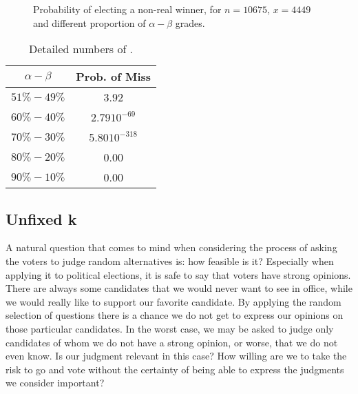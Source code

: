 \documentclass[version=3.21, pagesize, twoside=off, bibliography=totoc, DIV=calc, fontsize=12pt, a4paper]{scrartcl}
\begin{document}
\begin{figure}
	\centering
	\caption{Probability of electing a non-real winner, for $n=10675$, $x=4449$ and different proportion of $\alpha - \beta$ grades.}
	\label{fig:original}
\end{figure}

\begin{table}
	\centering
	\begin{tabular}{cc}
		\toprule
		{$\alpha-\beta$} & {Prob. of Miss} \\
		\midrule
		$51\%-49\%$	&	3.92	\\
		$60\%-40\%$	&	2.79$10^{-69}$	\\
		$70\%-30\%$	&	5.80$10^{-318}$	\\
		$80\%-20\%$	&	0.00	\\
		$90\%-10\%$	&	0.00	\\
		\bottomrule
	\end{tabular}
	\caption{Detailed numbers of .}
	\label{tab:original}
\end{table}

\subsection{Unfixed k}

A natural question that comes to mind when considering the process of asking the voters to judge random alternatives is: how feasible is it? Especially when applying it to political elections, it is safe to say that voters have strong opinions. There are always some candidates that we would never want to see in office, while we would really like to support our favorite candidate. By applying the random selection of questions there is a chance we do not get to express our opinions on those particular candidates. In the worst case, we may be asked to judge only candidates of whom we do not have a strong opinion, or worse, that we do not even know. Is our judgment relevant in this case? How willing are we to take the risk to go and vote without the certainty of being able to express the judgments we consider important?
\end{document}
